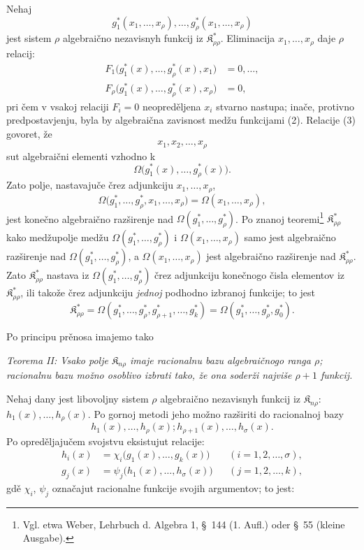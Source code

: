 \documentclass[11pt]{article}
\providecommand{\Kfield}{\mathfrak{K}}
\begin{document}
Nehaj
\begin{equation}
  g_1^*(x_1,\ldots,x_\rho),\ldots,
  g_\rho^*(x_1,\ldots,x_\rho)
\tag{2}
\end{equation}
jest sistem $\rho$ algebraično nezavisnyh funkcij iz $\Kfield^*_{\rho\rho}$. Eliminacija $x_1,\ldots,x_\rho$ daje $\rho$ relacij:
\begin{equation}
\begin{aligned}
  F_1\bigl(g_1^*(x),\ldots,g_\rho^*(x),x_1\bigr)&=0,\ldots,\\
  F_\rho\bigl(g_1^*(x),\ldots,g_\rho^*(x),x_\rho\bigr)&=0,
\end{aligned}
\tag{3}
\end{equation}
pri čem v vsakoj relaciji $F_i=0$ neopreděljena $x_i$ stvarno nastupa; inače, protivno predpostavjenju, byla by algebraična zavisnost medžu funkcijami (2). Relacije (3) govoret, že
\[
  x_1,x_2,\ldots,x_\rho
\]
sut algebraični elementi vzhodno k
\[
  \Omega\bigl(g_1^*(x),\ldots,g_\rho^*(x)\bigr).
\]
Zato polje, nastavajuče črez adjunkciju $x_1,\ldots,x_\rho$,
\[
  \Omega\bigl(g_1^*,\ldots,g_\rho^*,x_1,
  \ldots,x_\rho\bigr)=\Omega(x_1,\ldots,x_\rho),
\]
jest konečno algebraično razširenje nad $\Omega(g_1^*,\ldots,g_\rho^*)$. Po znanoj teoremi\footnote{Vgl. etwa Weber, Lehrbuch d. Algebra 1, \S\ 144 (1. Aufl.) oder \S\ 55 (kleine Ausgabe).} $\Kfield^*_{\rho\rho}$ kako medžupolje medžu $\Omega(g_1^*,\ldots,g_\rho^*)$ i $\Omega(x_1,
\ldots,x_\rho)$ samo jest algebraično razširenje nad $\Omega(g_1^*,\ldots,g_\rho^*)$, a $\Omega(x_1,
\ldots,x_\rho)$ jest algebraično razširenje nad $\Kfield^*_{\rho\rho}$. Zato $\Kfield^*_{\rho\rho}$ nastava iz $\Omega(g_1^*,\ldots,g_\rho^*)$ črez adjunkciju konečnogo čisla elementov iz $\Kfield^*_{\rho\rho}$, ili takože črez adjunkciju {\itshape jednoj} podhodno izbranoj funkcije; to jest
\[
  \Kfield^*_{\rho\rho}
  =\Omega(g_1^*,\ldots,g_\rho^*,g_{\rho+1}^*,\ldots,g_k^*)
  =\Omega(g_1^*,\ldots,g_\rho^*,g_0^*).
\]

Po principu prěnosa imajemo tako

{\itshape Teorema II: Vsako polje $\Kfield_{n\rho}$ imaje racionalnu bazu algebraičnogo ranga $\rho$; racionalnu bazu možno osoblivo izbrati tako, že ona soderži najviše $\rho+1$ funkcij.}

Nehaj dany jest libovoljny sistem $\rho$ algebraično nezavisnyh funkcij iz $\Kfield_{n\rho}$:
$h_1(x),\ldots,h_\rho(x)$. Po gornoj metodi jeho možno razširiti do racionalnoj bazy
\[
  h_1(x),\ldots,h_\rho(x);
  h_{\rho+1}(x),\ldots,h_\sigma(x).
\]
Po opreděljajučem svojstvu eksistujut relacije:
\[
\begin{aligned}
  h_i(x)&=\chi_i\bigl(g_1(x),\ldots,g_k(x)\bigr)
    &&(i=1,2,\ldots,\sigma),\\
  g_j(x)&=\psi_j\bigl(h_1(x),\ldots,h_\sigma(x)\bigr)
    &&(j=1,2,\ldots,k),
\end{aligned}
\]
gdě $\chi_i$, $\psi_j$ označajut racionalne funkcije svojih argumentov; to jest:
\end{document}
